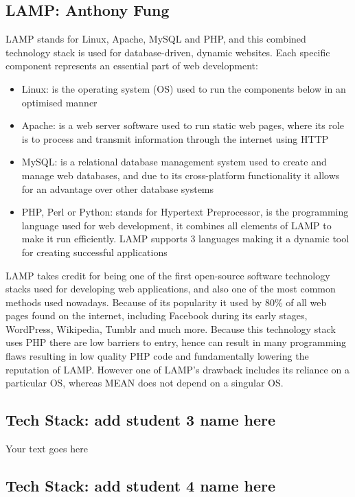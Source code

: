 \documentclass[a4paper, 11pt]{report}
\begin{document}
\subsection{LAMP: Anthony Fung}

\par LAMP stands for Linux, Apache, MySQL and PHP, and this combined technology stack is used for database-driven, dynamic websites. Each specific component represents an essential part of web development:

\begin{itemize}
\itemsep0em
	\item Linux: is the operating system (OS) used to run the components below in an optimised manner
	\item Apache: is a web server software used to run static web pages, where its role is to process and transmit information through the internet using HTTP
	\item MySQL: is a relational database management system used to create and manage web databases, and due to its cross-platform functionality it allows for an advantage over other database systems
	\item PHP, Perl or Python: stands for Hypertext Preprocessor, is the programming language used for web development, it combines all elements of LAMP to make it run efficiently. LAMP supports 3 languages making it a dynamic tool for creating successful applications
\end{itemize}

LAMP takes credit for being one of the first open-source software technology stacks used for developing web applications, and also one of the most common methods used nowadays. Because of its popularity it used by 80\% of all web pages found on the internet, including Facebook during its early stages, WordPress, Wikipedia, Tumblr and much more. Because this technology stack uses PHP there are low barriers to entry, hence can result in many programming flaws resulting in low quality PHP code and fundamentally lowering the reputation of LAMP. However one of LAMP's drawback includes its reliance on a particular OS, whereas MEAN does not depend on a singular OS. 


\subsection{Tech Stack: add student 3 name here}

Your text goes here

\subsection{Tech Stack: add student 4 name here}
\end{document}
